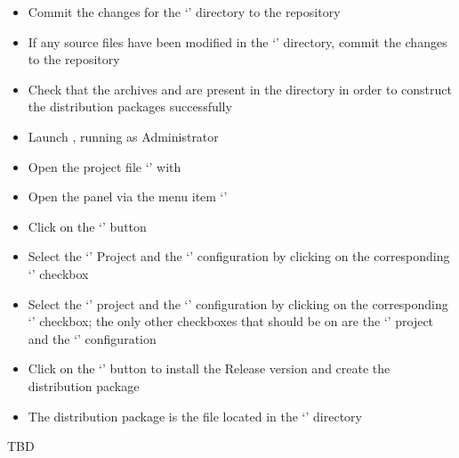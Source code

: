 \begin{itemize}
\item Commit the changes for the `' directory to the
 repository
\item\exSp{}If any source files have been modified in the
`' directory, commit the changes to the
 repository
\item\exSp{}Check that the archives  and  are
present in the  directory in order to
construct the distribution packages successfully
\item\exSp{}Launch , running as Administrator
\item\exSp{}Open the project file
`' with
\item\exSp{}Open the  panel via the menu item
`'
\item\exSp{}Click on the `' button
\item\exSp{}Select the `' Project and the `'
configuration by clicking on the corresponding `' checkbox
\item\exSp{}Select the `' project and the `'
configuration by clicking on the corresponding `' checkbox; the only other
checkboxes that should be on are the `' project and the
`' configuration
\item\exSp{}Click on the `' button to install the Release version and create
the distribution package
\item\exSp{}The distribution package is the  file located in
the `' directory
\end{itemize}
\tertiaryEnd
{}
TBD
\tertiaryEnd
\secondaryEnd
\appendixEnd{}
